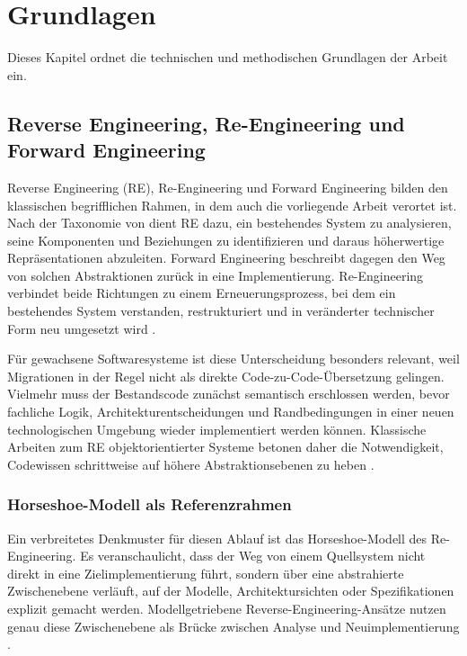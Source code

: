 \section{Grundlagen} \label{grundlagen}

Dieses Kapitel ordnet die technischen und methodischen Grundlagen der Arbeit ein.

\subsection{Reverse Engineering, Re-Engineering und Forward Engineering}

Reverse Engineering (RE), Re-Engineering und Forward Engineering bilden den klassischen begrifflichen Rahmen, in dem auch die vorliegende Arbeit verortet ist. Nach der Taxonomie von \textcite{chikofsky1990taxonomy} dient RE dazu, ein bestehendes System zu analysieren, seine Komponenten und Beziehungen zu identifizieren und daraus höherwertige Repräsentationen abzuleiten. Forward Engineering beschreibt dagegen den Weg von solchen Abstraktionen zurück in eine Implementierung. Re-Engineering verbindet beide Richtungen zu einem Erneuerungsprozess, bei dem ein bestehendes System verstanden, restrukturiert und in veränderter technischer Form neu umgesetzt wird \parencite{chikofsky1990taxonomy,raibulet2017mdre}.

Für gewachsene Softwaresysteme ist diese Unterscheidung besonders relevant, weil Migrationen in der Regel nicht als direkte Code-zu-Code-Übersetzung gelingen. Vielmehr muss der Bestandscode zunächst semantisch erschlossen werden, bevor fachliche Logik, Architekturentscheidungen und Randbedingungen in einer neuen technologischen Umgebung wieder implementiert werden können. Klassische Arbeiten zum RE objektorientierter Systeme betonen daher die Notwendigkeit, Codewissen schrittweise auf höhere Abstraktionsebenen zu heben \parencite{tonella2005reverseoo}.

\subsubsection{Horseshoe-Modell als Referenzrahmen}

Ein verbreitetes Denkmuster für diesen Ablauf ist das Horseshoe-Modell des Re-Engineering. Es veranschaulicht, dass der Weg von einem Quellsystem nicht direkt in eine Zielimplementierung führt, sondern über eine abstrahierte Zwischenebene verläuft, auf der Modelle, Architektursichten oder Spezifikationen explizit gemacht werden. Modellgetriebene Reverse-Engineering-Ansätze nutzen genau diese Zwischenebene als Brücke zwischen Analyse und Neuimplementierung \parencite{raibulet2017mdre}.

